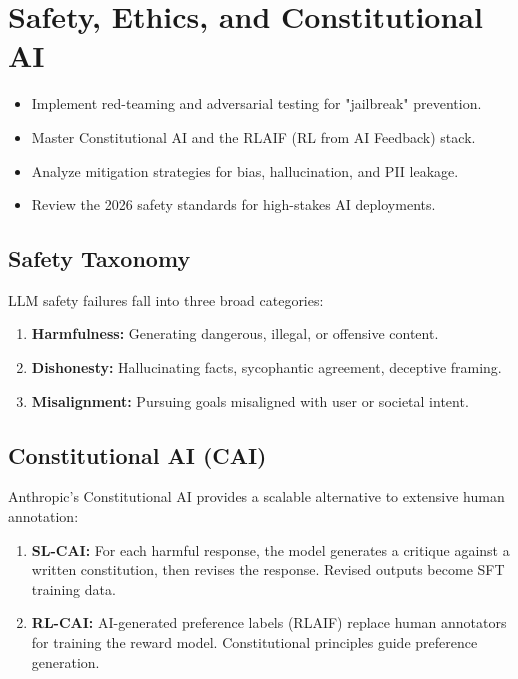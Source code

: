 \chapter{Safety, Ethics, and Constitutional AI}
\minitoc

\begin{chapteroverview}
  \begin{itemize}
    \item Implement red-teaming and adversarial testing for "jailbreak" prevention.
    \item Master Constitutional AI and the RLAIF (RL from AI Feedback) stack.
    \item Analyze mitigation strategies for bias, hallucination, and PII leakage.
    \item Review the 2026 safety standards for high-stakes AI deployments.
  \end{itemize}
\end{chapteroverview}

\section{Safety Taxonomy}

LLM safety failures fall into three broad categories:
\begin{enumerate}
  \item \textbf{Harmfulness:} Generating dangerous, illegal, or offensive content.
  \item \textbf{Dishonesty:} Hallucinating facts, sycophantic agreement, deceptive framing.
  \item \textbf{Misalignment:} Pursuing goals misaligned with user or societal intent.
\end{enumerate}

\section{Constitutional AI (CAI)}

Anthropic's Constitutional AI provides a scalable alternative to extensive human annotation:
\begin{enumerate}
  \item \textbf{SL-CAI:} For each harmful response, the model generates a critique against a written constitution, then revises the response. Revised outputs become SFT training data.
  \item \textbf{RL-CAI:} AI-generated preference labels (RLAIF) replace human annotators for training the reward model. Constitutional principles guide preference generation.
\end{enumerate}

